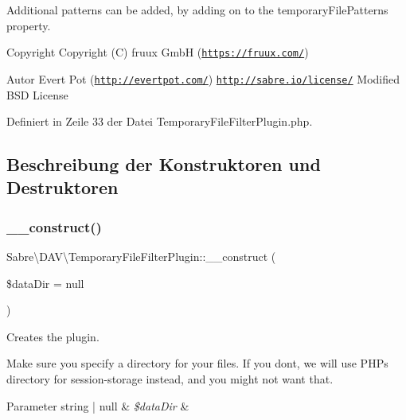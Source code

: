 Additional patterns can be added, by adding on to the temporary\+File\+Patterns property.

\begin{DoxyCopyright}{Copyright}
Copyright (C) fruux GmbH (\href{https://fruux.com/}{\tt https\+://fruux.\+com/}) 
\end{DoxyCopyright}
\begin{DoxyAuthor}{Autor}
Evert Pot (\href{http://evertpot.com/}{\tt http\+://evertpot.\+com/})  \href{http://sabre.io/license/}{\tt http\+://sabre.\+io/license/} Modified B\+SD License 
\end{DoxyAuthor}


Definiert in Zeile 33 der Datei Temporary\+File\+Filter\+Plugin.\+php.



\subsection{Beschreibung der Konstruktoren und Destruktoren}
\mbox{\label{class_sabre_1_1_d_a_v_1_1_temporary_file_filter_plugin_a762fe944736fc5eb23a8de3d5a2582d9}} 
\subsubsection{\texorpdfstring{\+\_\+\+\_\+construct()}{\_\_construct()}}
{\footnotesize\ttfamily Sabre\textbackslash{}\+D\+A\+V\textbackslash{}\+Temporary\+File\+Filter\+Plugin\+::\+\_\+\+\_\+construct (\begin{DoxyParamCaption}\item[{}]{\$data\+Dir = {\ttfamily null} }\end{DoxyParamCaption})}

Creates the plugin.

Make sure you specify a directory for your files. If you don\textquotesingle{}t, we will use P\+HP\textquotesingle{}s directory for session-\/storage instead, and you might not want that.


\begin{DoxyParams}[1]{Parameter}
string | null & {\em \$data\+Dir} & \\
\hline
\end{DoxyParams}


